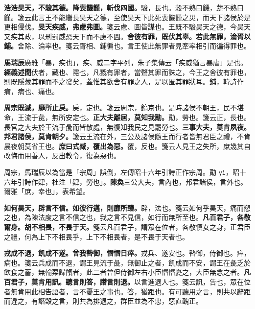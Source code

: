 \textbf{浩浩昊天，不駿其德。降喪饑饉，斬伐四國。}{\footnotesize 駿，長也。穀不熟曰饑，蔬不熟曰饉。箋云此言王不能繼長昊天之德，至使昊天下此死喪饑饉之災，而天下諸侯於是更相侵伐。}\textbf{旻天疾威，弗慮弗圖。}{\footnotesize 箋云慮、圖皆謀也。王既不駿昊天之德，今昊天又疾其政，以刑罰威恐天下而不慮不圖。}\textbf{舍彼有罪，既伏其辜。若此無罪，淪胥以鋪。}{\footnotesize 舍除、淪率也。箋云胥相、鋪徧也。言王使此無罪者見牽率相引而徧得罪也。}

\begin{quoting}\textbf{馬瑞辰}廣雅「暴，疾也」，疾、威二字平列，朱子集傳云「疾威猶言暴虐」是也。\textbf{經義述聞}伏者，藏也、隱也，凡戮有罪者，當聲其罪而誅之，今王之舍彼有罪也，則既隱藏其罪而不之發矣，蓋惟其欲舍有罪之人，是以匿其罪狀耳。鋪，韓詩作痡，病也、痛也。\end{quoting}

\textbf{周宗既滅，靡所止戾。}{\footnotesize 戾，定也。箋云周宗，鎬京也。是時諸侯不朝王，民不堪命，王流于彘，無所安定也。}\textbf{正大夫離居，莫知我勩。}{\footnotesize 勩，勞也。箋云正，長也。長官之大夫於王流于彘而皆散處，無復知我民之見罷勞也。}\textbf{三事大夫，莫肯夙夜。邦君諸侯，莫肯朝夕。}{\footnotesize 箋云王流在外，三公及諸侯隨王而行者皆無君臣之禮，不肯晨夜朝莫省王也。}\textbf{庶曰式臧，覆出為惡。}{\footnotesize 覆，反也。箋云人見王之失所，庶幾其自改悔而用善人，反出教令，復為惡也。}

\begin{quoting}周宗，馬瑞辰以為當是「宗周」誤倒，左傳昭十六年引詩正作宗周。勩 \texttt{yì}，昭十六年引詩作肄，杜注「肄，勞也」。\textbf{陳奐}三公大夫，言內也，邦君諸侯，言外也。爾雅「庶，幸也」，表希望。\end{quoting}

\textbf{如何昊天，辟言不信。如彼行邁，則靡所臻。}{\footnotesize 辟，法也。箋云如何乎昊天，痛而愬之也，為陳法度之言不信之也，我之言不見信，如行而無所至也。}\textbf{凡百君子，各敬爾身。胡不相畏，不畏于天。}{\footnotesize 箋云凡百君子，謂眾在位者，各敬慎女之身，正君臣之禮，何為上下不相畏乎，上下不相畏者，是不畏于天者也。}

\textbf{戎成不退，飢成不遂。曾我暬御，憯憯日瘁。}{\footnotesize 戎兵、遂安也。暬御，侍御也。瘁，病也。箋云兵成而不退，謂王見流于彘，無御止之者，飢成而不安，謂王在彘乏於飲食之蓄，無輸粟歸餼者，此二者曾但侍御左右小臣憯憯憂之，大臣無念之者。}\textbf{凡百君子，莫肯用訊。聽言則答，譖言則退。}{\footnotesize 以言進退人也。箋云訊，告也，眾在位者無肯用此相告語者，言不憂王之事也。答，猶距也。有可聽用之言，則共以辭距而違之，有譖毀之言，則共為排退之，群臣並為不忠，惡直醜正。}

